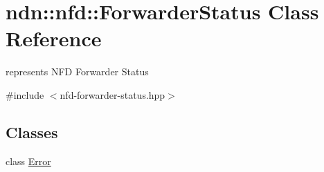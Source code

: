 \hypertarget{classndn_1_1nfd_1_1ForwarderStatus}{}\section{ndn\+:\+:nfd\+:\+:Forwarder\+Status Class Reference}
\label{classndn_1_1nfd_1_1ForwarderStatus}


represents N\+FD Forwarder Status  




{\ttfamily \#include $<$nfd-\/forwarder-\/status.\+hpp$>$}

\subsection*{Classes}
\begin{DoxyCompactItemize}
\item 
class \hyperlink{classndn_1_1nfd_1_1ForwarderStatus_1_1Error}{Error}
\end{DoxyCompactItemize}
